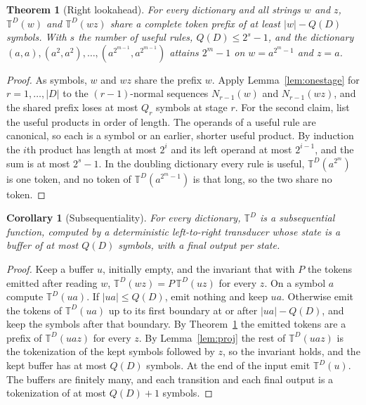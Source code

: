 \documentclass[11pt,a4paper]{article}
\theoremstyle{definition}
\theoremstyle{plain}
\newtheorem{theorem}{Theorem}
\newtheorem{corollary}{Corollary}
\newcommand{\T}{\mathbb{T}}
\begin{document}
\begin{theorem}[Right lookahead]\label{thm:lookahead}
For every dictionary and all strings \(w\) and \(z\), \(\T^D(w)\) and \(\T^D(wz)\) share a complete token prefix of at
least \(|w| - Q(D)\) symbols. With \(s\) the number of useful rules, \(Q(D) \le 2^{s} - 1\), and the dictionary
\((a, a), (a^2, a^2), \dots, (a^{2^{m-1}}, a^{2^{m-1}})\) attains \(2^m - 1\) on \(w = a^{2^m - 1}\) and \(z = a\).
\end{theorem}

\begin{proof}
As symbols, \(w\) and \(wz\) share the prefix \(w\). Apply Lemma~\ref{lem:onestage} for \(r = 1, \dots, |D|\) to the
\((r-1)\)-normal sequences \(N_{r-1}(w)\) and \(N_{r-1}(wz)\), and the shared prefix loses at most \(Q_r\) symbols at
stage \(r\). For the second claim, list the useful products in order of length. The operands of a useful rule are
canonical, so each is a symbol or an earlier, shorter useful product. By induction the \(i\)th product has length at
most \(2^i\) and its left operand at most \(2^{i-1}\), and the sum is at most \(2^s - 1\). In the doubling dictionary
every rule is useful, \(\T^D(a^{2^m})\) is one token, and no token of \(\T^D(a^{2^m - 1})\) is that long, so the two
share no token.
\end{proof}

\begin{corollary}[Subsequentiality]\label{cor:subsequential}
For every dictionary, \(\T^D\) is a subsequential function, computed by a deterministic left-to-right transducer whose
state is a buffer of at most \(Q(D)\) symbols, with a final output per state.
\end{corollary}

\begin{proof}
Keep a buffer \(u\), initially empty, and the invariant that with \(P\) the tokens emitted after reading \(w\),
\(\T^D(wz) = P\,\T^D(uz)\) for every \(z\). On a symbol \(a\) compute \(\T^D(ua)\). If \(|ua| \le Q(D)\), emit nothing
and keep \(ua\). Otherwise emit the tokens of \(\T^D(ua)\) up to its first boundary at or after \(|ua| - Q(D)\), and
keep the symbols after that boundary. By Theorem~\ref{thm:lookahead} the emitted tokens are a prefix of \(\T^D(uaz)\)
for every \(z\). By Lemma~\ref{lem:proj} the rest of \(\T^D(uaz)\) is the tokenization of the kept symbols followed by
\(z\), so the invariant holds, and the kept buffer has at most \(Q(D)\) symbols. At the end of the input emit
\(\T^D(u)\). The buffers are finitely many, and each transition and each final output is a tokenization of at most
\(Q(D) + 1\) symbols.
\end{proof}
\end{document}
